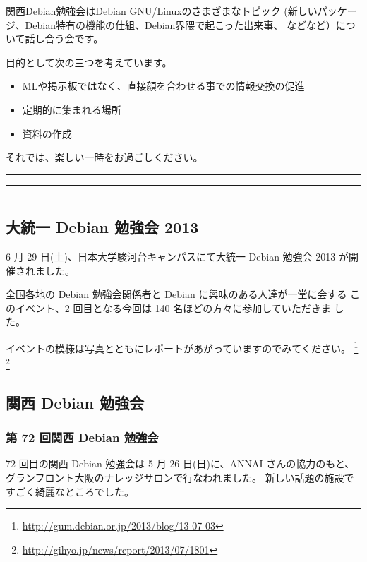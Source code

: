 \documentclass[mingoth,a4paper]{jsarticle}
\begin{document}
 関西Debian勉強会はDebian GNU/Linuxのさまざまなトピック
 (新しいパッケージ、Debian特有の機能の仕組、Debian界隈で起こった出来事、
 などなど）について話し合う会です。

 目的として次の三つを考えています。
 \begin{itemize}
  \item MLや掲示板ではなく、直接顔を合わせる事での情報交換の促進
  \item 定期的に集まれる場所
  \item 資料の作成
 \end{itemize}

 それでは、楽しい一時をお過ごしください。

\newpage

\begin{minipage}[b]{0.2\hsize}
 {}
\end{minipage}
\begin{minipage}[b]{0.8\hsize}
\hrule
\vspace{2mm}
\hrule
\setcounter{tocdepth}{1}
\tableofcontents
\vspace{2mm}
\hrule
\end{minipage}


\subsection{大統一 Debian 勉強会 2013}
6 月 29 日(土)、日本大学駿河台キャンパスにて大統一 Debian 勉強会 2013
が開催されました。

全国各地の Debian 勉強会関係者と Debian に興味のある人達が一堂に会する
このイベント、2 回目となる今回は 140 名ほどの方々に参加していただきま
した。

イベントの模様は写真とともにレポートがあがっていますのでみてください。
\footnote{\url{http://gum.debian.or.jp/2013/blog/13-07-03}}
\footnote{\url{http://gihyo.jp/news/report/2013/07/1801}}

\subsection{関西 Debian 勉強会}
\subsubsection{第 72 回関西 Debian 勉強会}

72 回目の関西 Debian 勉強会は 5 月 26 日(日)に、ANNAI さんの協力のもと、
グランフロント大阪のナレッジサロンで行なわれました。
新しい話題の施設ですごく綺麗なところでした。
\end{document}
